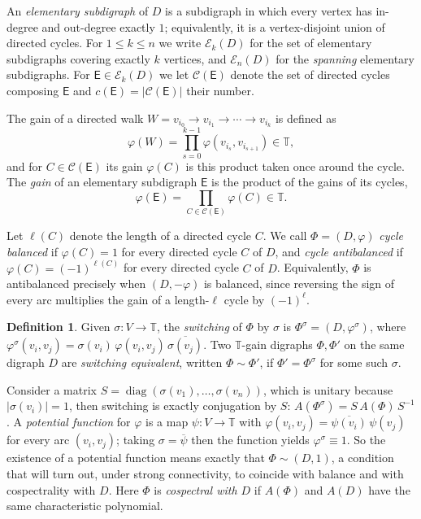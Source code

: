 \documentclass[12pt]{article}
\theoremstyle{definition}
\newtheorem{definition}[theorem]{Definition}
\begin{document}
An \emph{elementary subdigraph} of $D$ is a subdigraph in which every vertex has in-degree and out-degree exactly $1$; equivalently, it is a vertex-disjoint union of directed cycles. For $1 \le k \le n$ we write $\mathcal{E}_k(D)$ for the set of elementary subdigraphs covering exactly $k$ vertices, and $\mathcal{E}_n(D)$ for the \emph{spanning} elementary subdigraphs. For $\mathsf{E} \in \mathcal{E}_k(D)$ we let $\mathcal{C}(\mathsf{E})$ denote the set of directed cycles composing $\mathsf{E}$ and $c(\mathsf{E}) = | \mathcal{C}(\mathsf{E})|$ their number.

 The gain of a directed walk
$W = v_{i_0} \to v_{i_1} \to \cdots \to v_{i_k}$ is defined as
\[
  \varphi(W) = \prod_{s=0}^{k-1}\varphi(v_{i_s},v_{i_{s+1}}) \in \mathbb{T},
\]
and for $C \in \mathcal{C}(\mathsf{E})$ its gain $\varphi(C)$ is this product taken once around the cycle. The \emph{gain} of an elementary subdigraph $\mathsf{E}$ is the product of the gains of its cycles,
\[
  \varphi(\mathsf{E}) = \prod_{C \in \mathcal{C}(\mathsf{E})}\varphi(C) \in \mathbb{T}.
\]

Let $\ell(C)$ denote the length of a directed cycle $C$. We call
$\Phi = (D,\varphi)$ \emph{cycle balanced} if $\varphi(C) = 1$ for every directed cycle $C$ of $D$, and \emph{cycle antibalanced} if
$\varphi(C) = (-1)^{\ell(C)}$ for every directed cycle $C$ of $D$.
Equivalently, $\Phi$ is antibalanced precisely when $(D,-\varphi)$ is
balanced, since reversing the sign of every arc multiplies the gain of a length-$\ell$ cycle by $(-1)^{\ell}$.

\begin{definition}\label{def:switching}
Given $\sigma\colon V \to \mathbb{T}$, the \emph{switching} of $\Phi$ by $\sigma$ is $\Phi^{\sigma} = (D,\varphi^{\sigma})$, where
$\varphi^{\sigma}(v_i,v_j) = \sigma(v_i)\,\varphi(v_i,v_j)\,\overline{\sigma(v_j)}$. Two $\mathbb{T}$-gain digraphs $\Phi,\Phi'$ on the same digraph $D$ are \emph{switching equivalent}, written $\Phi \sim \Phi'$, if $\Phi' = \Phi^{\sigma}$ for some such $\sigma$.
\end{definition}

Consider a matrix $S = \operatorname{diag}(\sigma(v_1),\dots,\sigma(v_n))$, which is unitary because $|\sigma(v_i)| = 1$, then switching is exactly conjugation by $S$: $A(\Phi^{\sigma}) = S\,A(\Phi)\,S^{-1}$.  A \emph{potential function} for $\varphi$ is a map $\psi\colon V \to \mathbb{T}$ with $\varphi(v_i,v_j) = \overline{\psi(v_i)}\,\psi(v_j)$ for every arc $(v_i,v_j)$; taking $\sigma = \overline{\psi}$ then  the function yields $\varphi^{\sigma} \equiv 1$. So the existence of a potential function means exactly that $\Phi \sim (D,1)$, a condition that will turn out, under strong connectivity, to coincide with balance and with cospectrality with $D$. Here $\Phi$ is \emph{cospectral with $D$} if $A(\Phi)$ and $A(D)$ have the same characteristic polynomial.
\end{document}

